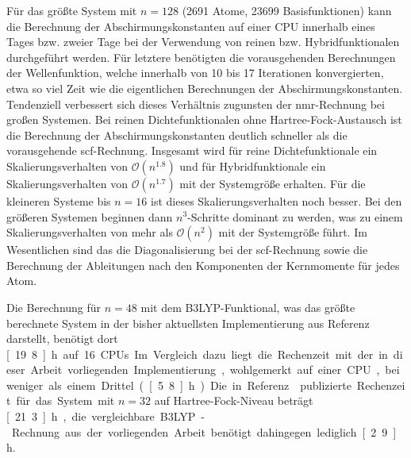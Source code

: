 \FloatBarrier

Für das größte System mit $n=128$ (2691 Atome, 23699 Basisfunktionen) kann die Berechnung der Abschirmungskonstanten auf einer CPU innerhalb eines Tages bzw. zweier Tage bei der Verwendung von reinen bzw. Hybridfunktionalen durchgeführt werden. Für letztere benötigten die vorausgehenden Berechnungen der Wellenfunktion, welche innerhalb von 10 bis 17 Iterationen konvergierten, etwa so viel Zeit wie die eigentlichen Berechnungen der Abschirmungskonstanten. Tendenziell verbessert sich dieses Verhältnis zugunsten der \ac{nmr}-Rechnung bei großen Systemen. Bei reinen Dichtefunktionalen ohne Hartree-Fock-Austausch ist die Berechnung der Abschirmungskonstanten deutlich schneller als die vorausgehende \ac{scf}-Rechnung. Insgesamt wird für reine Dichtefunktionale ein Skalierungsverhalten von $\mathcal{O}(n^{1.8})$ und für Hybridfunktionale ein Skalierungsverhalten von $\mathcal{O}(n^{1.7})$ mit der Systemgröße erhalten. Für die kleineren Systeme bis $n=16$ ist dieses Skalierungsverhalten noch besser. Bei den größeren Systemen beginnen dann $n^3$-Schritte dominant zu werden, was zu einem Skalierungsverhalten von mehr als $\mathcal{O}(n^{2})$ mit der Systemgröße führt. Im Wesentlichen sind das die Diagonalisierung bei der \ac{scf}-Rechnung sowie die Berechnung der Ableitungen nach den Komponenten der Kernmomente für jedes Atom. 

Die Berechnung für $n=48$ mit dem B3LYP-Funktional, was das größte berechnete System in der bisher aktuellsten Implementierung aus Referenz \cite{kumar2016nuclei} darstellt, benötigt dort \unit[19.8]{h} auf 16 CPUs. Im Vergleich dazu liegt die Rechenzeit mit der in dieser Arbeit vorliegenden Implementierung, wohlgemerkt auf einer CPU, bei weniger als einem Drittel (\unit[5.8]{h}). Die in Referenz \cite{beer2011nuclei} publizierte Rechenzeit für das System mit $n=32$ auf Hartree-Fock-Niveau beträgt \unit[21.3]{h}, die vergleichbare B3LYP-Rechnung aus der vorliegenden Arbeit benötigt dahingegen lediglich \unit[2.9]{h}.

